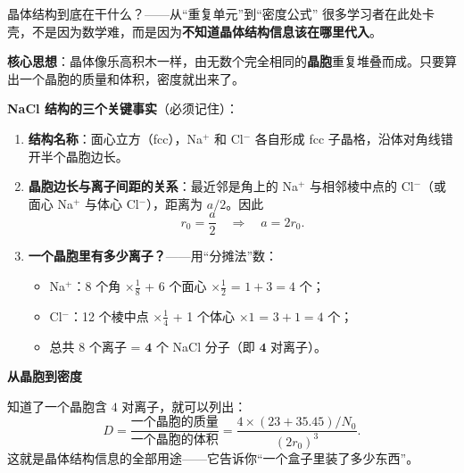 \begin{insightbox}{晶体结构到底在干什么？——从``重复单元''到``密度公式''}
很多学习者在此处卡壳，不是因为数学难，而是因为\textbf{不知道晶体结构信息该在哪里代入}。

\textbf{核心思想}：晶体像乐高积木一样，由无数个完全相同的\textbf{晶胞}重复堆叠而成。只要算出一个晶胞的质量和体积，密度就出来了。

\textbf{NaCl 结构的三个关键事实}（必须记住）：
\begin{enumerate}[nosep]
  \item \textbf{结构名称}：面心立方（fcc），Na$^+$ 和 Cl$^-$ 各自形成 fcc 子晶格，沿体对角线错开半个晶胞边长。
  \item \textbf{晶胞边长与离子间距的关系}：最近邻是角上的 Na$^+$ 与相邻棱中点的 Cl$^-$（或面心 Na$^+$ 与体心 Cl$^-$），距离为 $a/2$。因此
  \[
    r_0 = \frac{a}{2} \quad\Longrightarrow\quad a = 2r_0.
  \]
  \item \textbf{一个晶胞里有多少离子？}——用``分摊法''数：
  \begin{itemize}[nosep]
    \item Na$^+$：8 个角 $\times\frac{1}{8}$ + 6 个面心 $\times\frac{1}{2}$ = $1 + 3 = 4$ 个；
    \item Cl$^-$：12 个棱中点 $\times\frac{1}{4}$ + 1 个体心 $\times 1$ = $3 + 1 = 4$ 个；
    \item 总共 $8$ 个离子 = $\bm{4}$ 个 NaCl 分子（即 $\bm{4}$ 对离子）。
  \end{itemize}
\end{enumerate}

\textbf{从晶胞到密度}

知道了一个晶胞含 $4$ 对离子，就可以列出：
\[
  D = \frac{\text{一个晶胞的质量}}{\text{一个晶胞的体积}}
    = \frac{4\times(23+35.45)/N_0}{(2r_0)^3}.
\]
这就是晶体结构信息的全部用途——它告诉你``一个盒子里装了多少东西''。
\end{insightbox}

